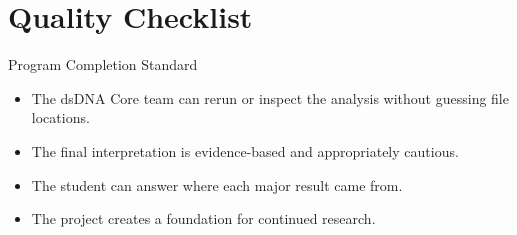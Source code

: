 \section{Quality Checklist}
\begin{checklistbox}{Program Completion Standard}
\begin{itemize}
  \item The dsDNA Core team can rerun or inspect the analysis without guessing file locations.
  \item The final interpretation is evidence-based and appropriately cautious.
  \item The student can answer where each major result came from.
  \item The project creates a foundation for continued research.
\end{itemize}
\end{checklistbox}
